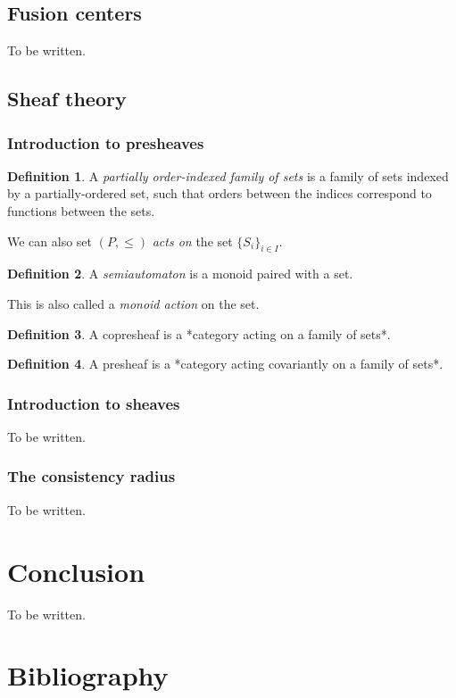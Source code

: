 \documentclass[]             %
{NASA}                       %
\theoremstyle{definition}
\newtheorem{definition}{Definition}[section]
\begin{document}
\hypertarget{fusion-centers}{%
\subsection{Fusion centers}\label{fusion-centers}}

To be written.

\hypertarget{sheaf-theory}{%
\subsection{Sheaf theory}\label{sheaf-theory}}

\hypertarget{introduction-to-presheaves}{%
\subsubsection{Introduction to
presheaves}\label{introduction-to-presheaves}}

\begin{definition}
A \emph{partially order-indexed family of sets} is a family of sets indexed by a partially-ordered set,
such that orders between the indices correspond to functions between the sets.
\end{definition}

We can also set \((P, \leq)\) \emph{acts on} the set
\(\{S_i\}_{i \in I}\).

\begin{definition}
A \emph{semiautomaton} is a monoid paired with a set.
\end{definition}

This is also called a \emph{monoid action} on the set.

\begin{definition}
A copresheaf is a *category acting on a family of sets*.
\end{definition}

\begin{definition}
A presheaf is a *category acting covariantly on a family of sets*.
\end{definition}

\hypertarget{introduction-to-sheaves}{%
\subsubsection{Introduction to sheaves}\label{introduction-to-sheaves}}

To be written.

\hypertarget{the-consistency-radius}{%
\subsubsection{The consistency radius}\label{the-consistency-radius}}

To be written.

\hypertarget{conclusion}{%
\section{Conclusion}\label{conclusion}}

\label{sec:conclusion}

To be written.

\section*{Bibliography}\label{bibliography}



\end{document}
